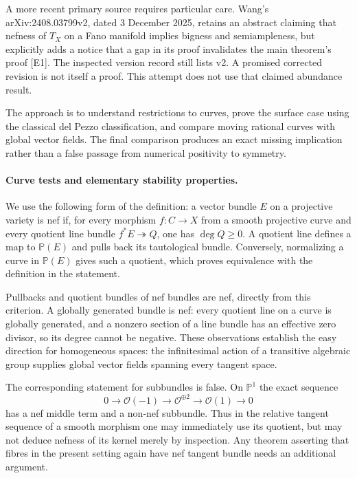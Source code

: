 \documentclass[11pt]{article}
\begin{document}
A more recent primary source requires particular care. Wang's
arXiv:2408.03799v2, dated 3 December 2025, retains an abstract claiming
that nefness of $T_X$ on a Fano manifold implies bigness and
semiampleness, but explicitly adds a notice that a gap in its proof
invalidates the main theorem's proof [E1]. The inspected version record
still lists v2. A promised corrected revision is not itself a proof.
This attempt does not use that claimed abundance result.

The approach is to understand restrictions to curves, prove the surface
case using the classical del Pezzo classification, and compare moving
rational curves with global vector fields. The final comparison produces
an exact missing implication rather than a false passage from numerical
positivity to symmetry.

\paragraph{Curve tests and elementary stability properties.}
We use the following form of the definition: a vector bundle $E$ on a
projective variety is nef if, for every morphism $f:C\to X$ from a
smooth projective curve and every quotient line bundle $f^*E\twoheadrightarrow Q$,
one has $\deg Q\geq0$. A quotient line defines a map to $\mathbb P(E)$
and pulls back its tautological bundle. Conversely, normalizing a curve
in $\mathbb P(E)$ gives such a quotient, which proves equivalence with
the definition in the statement.

Pullbacks and quotient bundles of nef bundles are nef, directly from
this criterion. A globally generated bundle is nef: every quotient line
on a curve is globally generated, and a nonzero section of a line bundle
has an effective zero divisor, so its degree cannot be negative.
These observations establish the easy direction for homogeneous spaces:
the infinitesimal action of a transitive algebraic group supplies global
vector fields spanning every tangent space.

The corresponding statement for subbundles is false. On $\mathbb P^1$
the exact sequence
\[
 0\longrightarrow\mathcal O(-1)\longrightarrow\mathcal O^{\oplus2}
 \longrightarrow\mathcal O(1)\longrightarrow0
\]
has a nef middle term and a non-nef subbundle. Thus in the relative
tangent sequence of a smooth morphism one may immediately use its
quotient, but may not deduce nefness of its kernel merely by inspection.
Any theorem asserting that fibres in the present setting again have
nef tangent bundle needs an additional argument.
\end{document}
